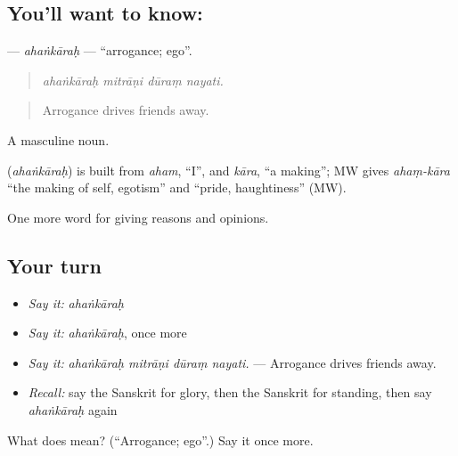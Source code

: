 \subsection*{You'll want to know: }
\textbf{} — \emph{ahaṅkāraḥ} — \textquotedblleft{}arrogance; ego\textquotedblright{}.

\begin{quote}
   
\end{quote}

\begin{quote}
\emph{ahaṅkāraḥ mitrāṇi dūraṃ nayati.}
\end{quote}

\begin{quote}
Arrogance drives friends away.
\end{quote}

A masculine noun.

\begin{cousinweb}
\textbf{} (\emph{ahaṅkāraḥ}) is built from \emph{aham}, \textquotedblleft{}I\textquotedblright{}, and \emph{kāra}, \textquotedblleft{}a making\textquotedblright{}; MW gives \emph{ahaṃ-kāra} \textquotedblleft{}the making of self, egotism\textquotedblright{} and \textquotedblleft{}pride, haughtiness\textquotedblright{} (MW).
\end{cousinweb}

\begin{grammarlens}[title={What you've built}]
One more word for giving reasons and opinions.
\end{grammarlens}

\subsection*{Your turn}
\begin{itemize}
\raggedright
  \item \emph{Say it:} \emph{ahaṅkāraḥ}
  \item \emph{Say it:} \emph{ahaṅkāraḥ}, once more
  \item \emph{Say it:} \emph{ahaṅkāraḥ mitrāṇi dūraṃ nayati.} — Arrogance drives friends away.
  \item \emph{Recall:} say the Sanskrit for glory, then the Sanskrit for standing, then say \emph{ahaṅkāraḥ} again
\end{itemize}

\begin{tcolorbox}[breakable,colback=teal!4,colframe=teal!35!black,title={Before you move on}]
What does  mean? (\textquotedblleft{}Arrogance; ego\textquotedblright{}.) Say it once more.
\end{tcolorbox}
